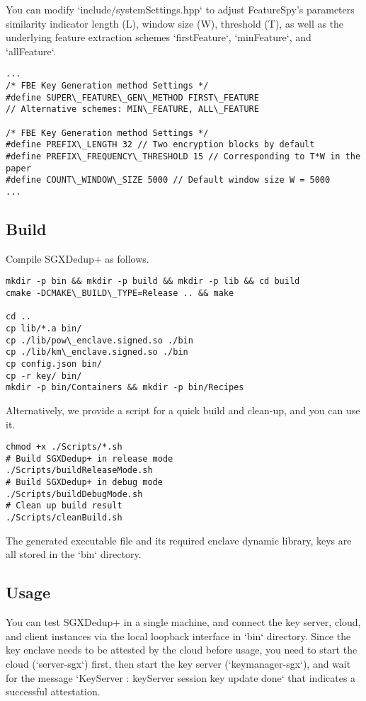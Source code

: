You can modify `include/systemSettings.hpp` to adjust FeatureSpy's parameters similarity indicator length (L), window size (W), threshold (T), as well as the underlying feature extraction schemes `firstFeature`, `minFeature`, and `allFeature`.


\begin{lstlisting}[style=c++]
...
/* FBE Key Generation method Settings */
#define SUPER\_FEATURE\_GEN\_METHOD FIRST\_FEATURE
// Alternative schemes: MIN\_FEATURE, ALL\_FEATURE

/* FBE Key Generation method Settings */
#define PREFIX\_LENGTH 32 // Two encryption blocks by default
#define PREFIX\_FREQUENCY\_THRESHOLD 15 // Corresponding to T*W in the paper
#define COUNT\_WINDOW\_SIZE 5000 // Default window size W = 5000
...
\end{lstlisting}

\subsection{Build}

Compile SGXDedup+ as follows.

\begin{lstlisting}[style=shell]
mkdir -p bin && mkdir -p build && mkdir -p lib && cd build
cmake -DCMAKE\_BUILD\_TYPE=Release .. && make

cd ..
cp lib/*.a bin/
cp ./lib/pow\_enclave.signed.so ./bin
cp ./lib/km\_enclave.signed.so ./bin
cp config.json bin/
cp -r key/ bin/
mkdir -p bin/Containers && mkdir -p bin/Recipes
\end{lstlisting}

Alternatively, we provide a script for a quick build and clean-up, and you can use it.

\begin{lstlisting}[style=shell]
chmod +x ./Scripts/*.sh
# Build SGXDedup+ in release mode
./Scripts/buildReleaseMode.sh
# Build SGXDedup+ in debug mode
./Scripts/buildDebugMode.sh
# Clean up build result
./Scripts/cleanBuild.sh
\end{lstlisting}

The generated executable file and its required enclave dynamic library, keys are all stored in the `bin` directory.

\subsection{Usage}

You can test SGXDedup+ in a single machine, and connect the key server, cloud, and client instances via the local loopback interface in `bin` directory. Since the key enclave needs to be attested by the cloud before usage, you need to start the cloud (`server-sgx`) first, then start the key server (`keymanager-sgx`), and wait for the message `KeyServer : keyServer session key update done` that indicates a successful attestation.

